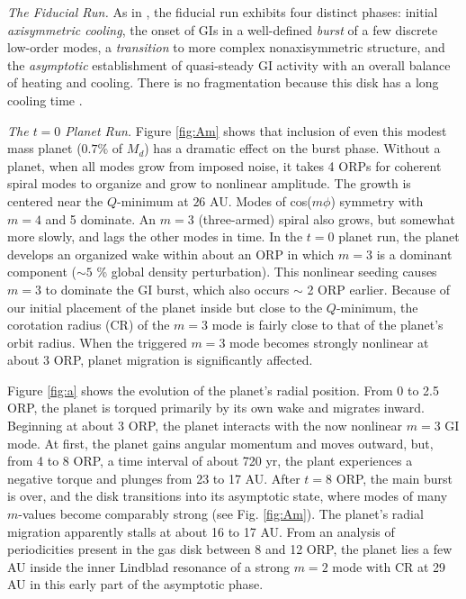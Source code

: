 \documentclass[12pt,manuscript,authoryear]{aastex}
\begin{document}
{\it The Fiducial Run.} As in \citet{mejia2005}, the fiducial run exhibits four distinct phases: initial {\sl axisymmetric cooling}, the onset of GIs in a well-defined {\sl burst} of a few discrete low-order modes, a {\sl transition} to more complex nonaxisymmetric structure, and the {\sl asymptotic} establishment of quasi-steady GI activity with an overall balance of heating and cooling. There is no fragmentation because this disk has a long cooling time \citep{gammie2001,boley2006,boley2007b}.

{\it The $t = 0$ Planet Run.} Figure \ref{fig:Am} shows that inclusion of even this modest mass planet ($0.7 \%$ of $M_d$) has a dramatic effect on the burst phase. Without a planet, when all modes grow from imposed noise, it takes 4 ORPs for coherent spiral modes to organize and grow to nonlinear amplitude. The growth is centered near the $Q$-minimum at $26$ AU. Modes of cos($m\phi$) symmetry with $m = 4$ and 5 dominate. An $m = 3$ (three-armed) spiral also grows, but somewhat more slowly, and lags the other modes in time. In the $t = 0$ planet run, the planet develops an organized wake within about an ORP in which $m = 3$ is a dominant component ($\sim 5$ \% global density perturbation). This nonlinear seeding causes $m = 3$ to dominate the GI burst, which also occurs $\sim$ 2 ORP earlier. Because of our initial placement of the planet inside but close to the $Q$-minimum, the corotation radius (CR) of the $m = 3$ mode is fairly close to that of the planet's orbit radius. When the triggered $m = 3$ mode becomes strongly nonlinear at about 3 ORP, planet migration is significantly affected.

Figure \ref{fig:a} shows the evolution of the planet's radial position. From 0 to 2.5 ORP, the planet is torqued primarily by its own wake and migrates inward. 
Beginning at about 3 ORP, the planet interacts with the now nonlinear $m = 3$ GI mode. At first, the planet gains angular momentum and moves outward, but, from 4 to 8 ORP, a time interval of  about 720 yr, the plant experiences a negative torque and plunges from 23 to 17 AU.
After $t = 8$ ORP, the main burst is over, and the disk transitions into its asymptotic state, where modes of many $m$-values become comparably strong (see Fig. \ref{fig:Am}). The planet's radial migration apparently stalls at about 16 to 17 AU. From an analysis of periodicities present in the gas disk between 8 and 12 ORP, the planet lies a few AU inside the inner Lindblad resonance of a strong $m = 2$ mode with CR at 29 AU in this early part of the asymptotic phase. 
\end{document}
